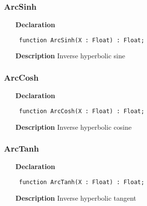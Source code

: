 \documentclass[12pt,a4paper,oneside]{report}
\newcommand{\declarationitem}[1]{\textbf{#1}}
\newcommand{\descriptiontitle}[1]{\textbf{#1}}
\newcommand{\code}[1]{\texttt{#1}}
\begin{document}
\subsubsection{ArcSinh}
\label{uhyper-ArcSinh}
\begin{itemize}\item[\declarationitem{Declaration}\hfill]
	\begin{flushleft}
		\code{
			function ArcSinh(X : Float) : Float;}
		
	\end{flushleft}
	
	\par
	\item[\descriptiontitle{Description}]
	Inverse hyperbolic sine
	
\end{itemize}
\subsubsection{ArcCosh}
\label{uhyper-ArcCosh}
\begin{itemize}\item[\declarationitem{Declaration}\hfill]
	\begin{flushleft}
		\code{
			function ArcCosh(X : Float) : Float;}
		
	\end{flushleft}
	
	\par
	\item[\descriptiontitle{Description}]
	Inverse hyperbolic cosine
	
\end{itemize}
\subsubsection{ArcTanh}
\label{uhyper-ArcTanh}
\begin{itemize}\item[\declarationitem{Declaration}\hfill]
	\begin{flushleft}
		\code{
			function ArcTanh(X : Float) : Float;}
		
	\end{flushleft}
	
	\par
	\item[\descriptiontitle{Description}]
	Inverse hyperbolic tangent
	
\end{itemize}
\end{document}
